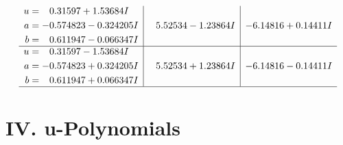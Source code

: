 \documentclass[1p]{elsarticle_modified}
\theoremstyle{definition}
\begin{document}
$$\begin{array}{c|c|c}
\begin{aligned}
u &= \phantom{-}0.31597 + 1.53684 I \\
a &= -0.574823 - 0.324205 I \\
b &= \phantom{-}0.611947 - 0.066347 I\end{aligned}
 & \phantom{-}5.52534 - 1.23864 I & -6.14816 + 0.14411 I \\ \hline\begin{aligned}
u &= \phantom{-}0.31597 - 1.53684 I \\
a &= -0.574823 + 0.324205 I \\
b &= \phantom{-}0.611947 + 0.066347 I\end{aligned}
 & \phantom{-}5.52534 + 1.23864 I & -6.14816 - 0.14411 I\\
 \hline 
 \end{array}$$\newpage
\newpage\renewcommand{\arraystretch}{1}
\centering \section*{ IV. u-Polynomials}
\end{document}
